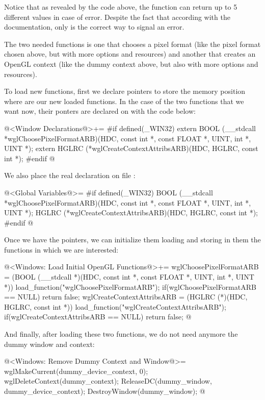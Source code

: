 Notice that as revealed by the code above, the
function  can return up to 5 different
values in case of error. Despite the fact that according with the
documentation, only  is the correct way to signal an
error.

The two needed functions is one that chooses a pixel format (like the
pixel format chosen above, but with more options and resources) and
another that creates an OpenGL context (like the dummy context above,
but also with more options and resources).

To load new functions, first we declare pointers to store the memory
position where are our new loaded functions. In the case of the two
functions that we want now, their ponters are declared
on  with the code below:

\iniciocodigo
@<Window Declarations@>+=
#if defined(_WIN32)
extern BOOL (__stdcall *wglChoosePixelFormatARB)(HDC, const int *, const FLOAT *,
                                                 UINT, int *, UINT *);
extern HGLRC (*wglCreateContextAttribsARB)(HDC, HGLRC, const int *);
#endif
@
\fimcodigo


We also place the real declaration on file :

\iniciocodigo
@<Global Variables@>=
#if defined(_WIN32)
BOOL (__stdcall *wglChoosePixelFormatARB)(HDC, const int *, const FLOAT *, UINT,
                                          int *, UINT *);
HGLRC (*wglCreateContextAttribsARB)(HDC, HGLRC, const int *);
#endif
@
\fimcodigo

Once we have the pointers, we can initialize them loading and storing
in them the functions in which we are interested:

\iniciocodigo
@<Windows: Load Initial OpenGL Functions@>+=
wglChoosePixelFormatARB = (BOOL (__stdcall *)(HDC, const int *, const FLOAT *,
                                              UINT, int *, UINT *))
                          load_function("wglChoosePixelFormatARB");
if(wglChoosePixelFormatARB == NULL) return false;
wglCreateContextAttribsARB = (HGLRC (*)(HDC, HGLRC, const int *))
                               load_function("wglCreateContextAttribsARB");
if(wglCreateContextAttribsARB == NULL) return false;
@
\fimcodigo

And finally, after loading these two functions, we do not need anymore
the dummy window and context:

\iniciocodigo
@<Windows: Remove Dummy Context and Window@>=
wglMakeCurrent(dummy_device_context, 0);
wglDeleteContext(dummy_context);
ReleaseDC(dummy_window, dummy_device_context);
DestroyWindow(dummy_window);
@
\fimcodigo

